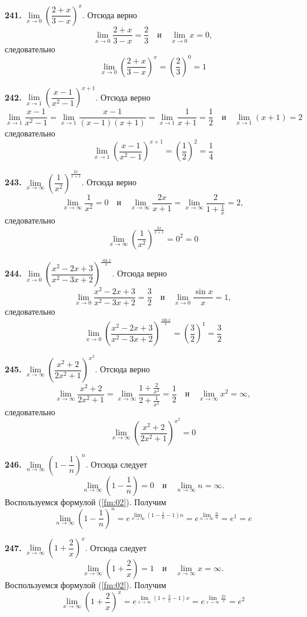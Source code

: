 \documentclass[12pt]{article}
\begin{document}
	\medskip
	{\bf 241.} $\lim\limits_{x\to0}\left(\dfrac{2+x}{3-x}\right)^x$.  Отсюда верно
	\[
		\lim\limits_{x\to0}\dfrac{2+x}{3-x} = \dfrac{2}{3}\quad\text{и}\quad\lim\limits_{x\to0}x = 0,
	\]
	следовательно
	\[
		\lim\limits_{x\to0}\left(\dfrac{2+x}{3-x}\right)^x = \left(\dfrac{2}{3}\right)^0 = 1
	\]
	
	
	\medskip
	{\bf 242.} $\lim\limits_{x\to1}\left(\dfrac{x-1}{x^2-1}\right)^{x+1}$. Отсюда верно
	\[
		\lim\limits_{x\to1}\dfrac{x-1}{x^2-1} = \lim\limits_{x\to1}\dfrac{x-1}{(x-1)(x+1)} = \lim\limits_{x\to1}\dfrac{1}{x+1} = \dfrac{1}{2}\quad\text{и}\quad\lim\limits_{x\to1}(x+1) = 2
	\]
	следовательно
	\[
		\lim\limits_{x\to1}\left(\dfrac{x-1}{x^2-1}\right)^{x+1} = \left(\dfrac{1}{2}\right)^2 = \dfrac{1}{4}
	\]
	
	\medskip
	{\bf 243.} $\lim\limits_{x\to\infty}\left(\dfrac{1}{x^2}\right)^{\frac{2x}{x+1}}$. Отсюда верно
	\[
		\lim\limits_{x\to\infty}\dfrac{1}{x^2} = 0\quad\text{и}\quad\lim\limits_{x\to\infty}\dfrac{2x}{x+1} = \lim\limits_{x\to\infty} \dfrac{2}{1+\frac{1}{x}} = 2,
	\]
	следовательно
	\[
		\lim\limits_{x\to\infty}\left(\dfrac{1}{x^2}\right)^{\frac{2x}{x+1}} = 0^2=0
	\]
	
	\medskip
	{\bf 244.} $\lim\limits_{x\to0}\left(\dfrac{x^2-2x+3}{x^2-3x+2}\right)^{\frac{\sin x}{x}}$. Отсюда верно
	\[
		\lim\limits_{x\to0}\dfrac{x^2-2x+3}{x^2-3x+2} = \dfrac{3}{2}\quad\text{и}\quad\lim\limits_{x\to0}\dfrac{\sin x}{x}=1,
	\]
	следовательно
	\[
	\lim\limits_{x\to0}\left(\dfrac{x^2-2x+3}{x^2-3x+2}\right)^{\frac{\sin x}{x}} = \left(\dfrac{3}{2}\right)^1 = \dfrac{3}{2}
	\]
	
	\medskip
	{\bf 245.} $\lim\limits_{x\to\infty}\left(\dfrac{x^2+2}{2x^2+1}\right)^{x^2}$. Отсюда верно
	\[
		\lim\limits_{x\to\infty} \dfrac{x^2+2}{2x^2+1} = \lim\limits_{x\to\infty} \dfrac{1+\frac{2}{x^2}}{2+\frac{1}{x^2}} = \dfrac{1}{2}\quad\text{и}\quad\lim\limits_{x\to\infty}x^2=\infty,
	\]
	следовательно
	\[
		\lim\limits_{x\to\infty}\left(\dfrac{x^2+2}{2x^2+1}\right)^{x^2} = 0
	\]
	
	\medskip
	{\bf 246.} $\lim\limits_{n\to\infty}\left(1-\dfrac{1}{n}\right)^n$. Отсюда следует
	\[
		\lim\limits_{n\to\infty}\left(1-\dfrac{1}{n}\right) = 0\quad\text{и}\quad\lim\limits_{n\to\infty}n = \infty.
	\]
	Воспользуемся формулой (\ref{fm:02}). Получим
	\[
		\lim\limits_{n\to\infty}\left(1-\dfrac{1}{n}\right)^n = e^{\lim\limits_{n\to\infty}\left(1-\frac{1}{n}-1\right)n} = e^{\lim\limits_{n\to\infty}\frac{n}{n}} = e^1 = e
	\]
	
	\medskip
	{\bf 247.} $\lim\limits_{x\to\infty}\left(1+\dfrac{2}{x}\right)^x$. Отсюда следует
	\[
		\lim\limits_{x\to\infty}\left(1+\dfrac{2}{x}\right) = 1\quad\text{и}\quad\lim\limits_{x\to\infty}x = \infty.
	\]
	Воспользуемся формулой (\ref{fm:02}). Получим
	\[
		\lim\limits_{x\to\infty}\left(1+\dfrac{2}{x}\right)^x = e^{\lim\limits_{x\to\infty}\left(1+\frac{2}{x}-1\right)x} = e^{\lim\limits_{x\to\infty}\frac{2x}{x}} = e^2
	\]
	
\end{document}
